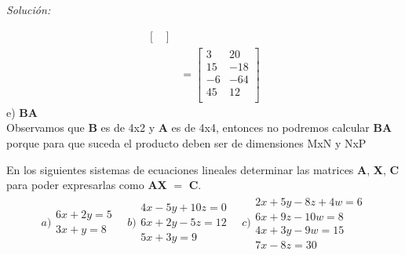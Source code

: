 \documentclass[12pt]{article}
\newenvironment{problem}[2][Problema]{\begin{trivlist}
\item[\hskip \labelsep {\bfseries #1}\hskip \labelsep {\bfseries #2.}]}{\end{trivlist}}
\newenvironment{sol}
    {\emph{Solución:}
    }
    {
    }
\begin{document}
\begin{sol}
\begin{align*}
\begin{bmatrix}
\end{bmatrix} \\
&=
\begin{bmatrix}
3 & 20 \\
15 & -18 \\
-6 & -64 \\
45 & 12 \\
\end{bmatrix}
\end{align*}
e) \textbf{BA} \\
Observamos que \textbf{B} es de 4x2 y \textbf{A} es de 4x4, entonces no podremos calcular \textbf{B}\textbf{A} porque para que suceda el producto deben ser de dimensiones MxN y NxP
\end{sol}

\pagebreak

\begin{problem}{2} 
En los siguientes sistemas de ecuaciones lineales determinar las matrices \textbf{A}, \textbf{X}, \textbf{C} para poder
expresarlas como \textbf{AX} $=$ \textbf{C}. \\
\begin{align*}
a) 
\begin{matrix}
6x+2y=5 \\
3x+y=8
\end{matrix}
\quad b)
\begin{matrix}
4x-5y+10z =0 \\
6x+2y-5z=12 \\
5x+3y = 9
\end{matrix}
\quad
c)\begin{matrix}
2x+5y-8z+4w = 6\\
6x + 9z -10w =8 \\
4x +3y -9w = 15 \\
7x - 8z =30
\end{matrix}
\end{align*}
\end{problem}
\end{document}

